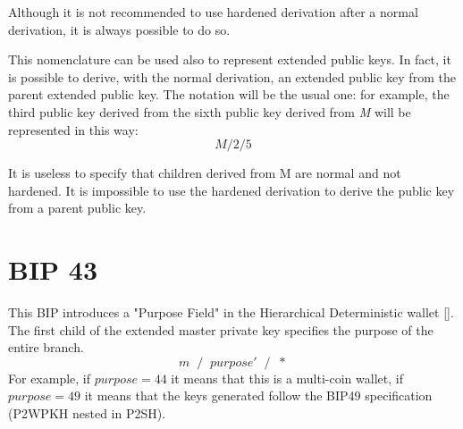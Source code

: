 \begin{remark}
	Although it is not recommended to use hardened derivation after a normal derivation, it is always possible to do so.
\end{remark}
This nomenclature can be used also to represent extended public keys. In fact, it is possible to derive, with the normal derivation, an extended public key from the parent extended public key. The notation will be the usual one: for example, the third public key derived from the sixth public key derived from \textit{M} will be represented in this way:
\begin{equation*}
M /2/5
\end{equation*}

\begin{remark}
It is useless to specify that children derived from M are normal and not hardened. It is impossible to use the hardened derivation to derive the public key from a parent public key.
\end{remark}

  
\section{BIP 43}
This BIP introduces a "Purpose Field" in the Hierarchical Deterministic wallet [\cite{4}]. The first child of the extended master private key specifies the purpose of the entire branch.
\begin{equation*}
m\; \;/\;\; purpose'\;\; /\;\; *
\end{equation*}
For example, if $purpose=44$ it means that this is a multi-coin wallet, if $purpose=49$ it means that the keys generated follow the BIP49 specification (P2WPKH nested in P2SH).

